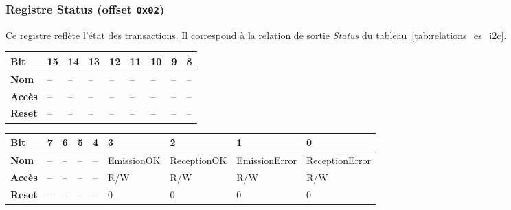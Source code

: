 \subsubsection{Registre Status (offset \texttt{0x02})}

Ce registre reflète l'état des transactions. Il correspond à la relation de sortie \textit{Status} du tableau~\ref{tab:relations_es_i2c}.

\begin{table}[H]
\centering
\small
\setlength{\tabcolsep}{3pt}
\begin{tabular}{|l|*{8}{C{1.6cm}|}}
\hline
\textbf{Bit} & \textbf{15} & \textbf{14} & \textbf{13} & \textbf{12} & \textbf{11} & \textbf{10} & \textbf{9} & \textbf{8} \\ \hline
\textbf{Nom} & -- & -- & -- & -- & -- & -- & -- & -- \\ \hline
\textbf{Accès} & -- & -- & -- & -- & -- & -- & -- & -- \\ \hline
\textbf{Reset} & -- & -- & -- & -- & -- & -- & -- & -- \\ \hline
\end{tabular}
\end{table}

\begin{table}[H]
\centering
\small
\setlength{\tabcolsep}{3pt}
\begin{tabular}{|l|*{8}{C{1.6cm}|}}
\hline
\textbf{Bit} & \textbf{7} & \textbf{6} & \textbf{5} & \textbf{4} & \textbf{3} & \textbf{2} & \textbf{1} & \textbf{0} \\ \hline
\textbf{Nom} & -- & -- & -- & -- & \scriptsize EmissionOK & \scriptsize ReceptionOK & \scriptsize EmissionError & \scriptsize ReceptionError \\ \hline
\textbf{Accès} & -- & -- & -- & -- & R/W & R/W & R/W & R/W \\ \hline
\textbf{Reset} & -- & -- & -- & -- & 0 & 0 & 0 & 0 \\ \hline
\end{tabular}
\end{table}

